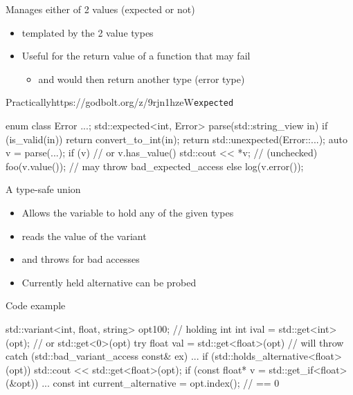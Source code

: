\begin{frame}[fragile]
  \begin{block}{Manages either of 2 values (expected or not)}
    \begin{itemize}
    \item templated by the 2 value types
    \item Useful for the return value of a function that may fail
      \begin{itemize}
      \item and would then return another type (error type)
      \end{itemize}
    \end{itemize}
  \end{block}
  \begin{exampleblockGB}{Practically}{https://godbolt.org/z/9rjn1hzeW}{\texttt{expected}}
    \small
    \begin{cppcode*}{}
      enum class Error {...};
      std::expected<int, Error> parse(std::string_view in) {
        if (is_valid(in)) return convert_to_int(in);
        return std::unexpected(Error::...);
      }
      auto v = parse(...);
      if (v) { // or v.has_value()
        std::cout << *v; // (unchecked)
        foo(v.value());  // may throw bad_expected_access
      } else
        log(v.error());
    \end{cppcode*}
  \end{exampleblockGB}
\end{frame}

\begin{frame}[fragile]
  \begin{block}{A type-safe union}
    \begin{itemize}
    \item Allows the variable to hold any of the given types
    \item {} reads the value of the variant
    \item and throws  for bad accesses
    \item Currently held alternative can be probed
    \end{itemize}
  \end{block}
  \begin{exampleblock}{Code example}
    \small
    \begin{cppcode*}{}
      std::variant<int, float, string> opt{100}; // holding int
      int ival = std::get<int>(opt); // or std::get<0>(opt)
      try {
        float val = std::get<float>(opt) // will throw
      } catch (std::bad_variant_access const& ex) {...}
      if (std::holds_alternative<float>(opt))
          std::cout << std::get<float>(opt);
      if (const float* v = std::get_if<float>(&opt)) { ... }
      const int current_alternative = opt.index(); // == 0
    \end{cppcode*}
  \end{exampleblock}

\end{frame}

